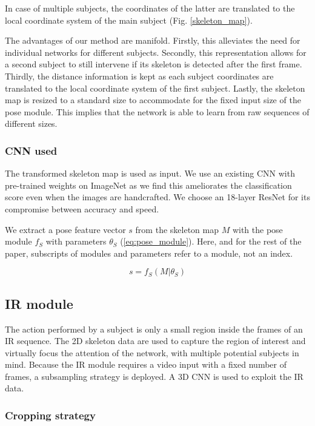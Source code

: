 \documentclass[letterpaper, 10 pt, conference]{ieeeconf}
\begin{document}
In case of multiple subjects, the coordinates of the latter are translated to the local coordinate system of the main subject (Fig. \ref{skeleton_map}).

The advantages of our method are manifold. Firstly, this alleviates the need for individual networks for different subjects. Secondly, this representation allows for a second subject to still intervene if its skeleton is detected after the first frame. Thirdly, the distance information is kept as each subject coordinates are translated to the local coordinate system of the first subject. Lastly, the skeleton map is resized to a standard size to accommodate for the fixed input size of the pose module. This implies that the network is able to learn from raw sequences of different sizes.

\subsubsection{CNN used}

The transformed skeleton map is used as input. We use an existing CNN with pre-trained weights on ImageNet as we find this ameliorates the classification score even when the images are handcrafted. We choose an 18-layer ResNet \cite{he2016deep} for its compromise between accuracy and speed. 

We extract a pose feature vector $s$ from the skeleton map $M$ with the pose module $f_S$ with parameters $\theta_S$ (\ref{eq:pose_module}). Here, and for the rest of the paper, subscripts of modules and parameters refer to a module, not an index.

\begin{equation} \label{eq:pose_module}
s = f_S(M|\theta_S)
\end{equation}


\subsection{IR module}

The action performed by a subject is only a small region inside the frames of an IR sequence. The 2D skeleton data are used to capture the region of interest and virtually focus the attention of the network, with multiple potential subjects in mind. Because the IR module requires a video input with a fixed number of frames, a subsampling strategy is deployed. A 3D CNN is used to exploit the IR data.  

\subsubsection{Cropping strategy} \label{cropping_strategy}
\end{document}
